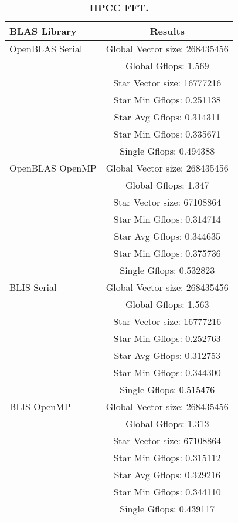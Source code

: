 \begin{table}[h]
\begin{center}
\begin{tabular}{ |l|c| } 
\hline
\textbf{BLAS Library} & \textbf{Results} \\ 
\hline
OpenBLAS Serial & Global Vector size: 268435456\\
                & Global Gflops:      1.569 \\
                \cline{2-2} 
                & Star Vector size:   16777216 \\
                & Star Min Gflops:    0.251138 \\
                & Star Avg Gflops:    0.314311 \\ 
                & Star Min Gflops:    0.335671 \\
                \cline{2-2}
                & Single Gflops:      0.494388 \\
\hline
OpenBLAS OpenMP & Global Vector size: 268435456 \\
                & Global Gflops:      1.347 \\
                \cline{2-2} 
                & Star Vector size:   67108864 \\
                & Star Min Gflops:    0.314714 \\
                & Star Avg Gflops:    0.344635 \\ 
                & Star Min Gflops:    0.375736 \\
                \cline{2-2}
                & Single Gflops:      0.532823 \\
\hline
BLIS Serial     & Global Vector size: 268435456 \\
                & Global Gflops:      1.563 \\
                \cline{2-2} 
                & Star Vector size:   16777216 \\
                & Star Min Gflops:    0.252763 \\
                & Star Avg Gflops:    0.312753 \\ 
                & Star Min Gflops:    0.344300 \\
                \cline{2-2}
                & Single Gflops:      0.515476\\
\hline
BLIS OpenMP     & Global Vector size: 268435456 \\
                & Global Gflops:      1.313 \\
                \cline{2-2} 
                & Star Vector size:   67108864 \\
                & Star Min Gflops:    0.315112 \\
                & Star Avg Gflops:    0.329216 \\ 
                & Star Min Gflops:    0.344110 \\
                \cline{2-2}
                & Single Gflops:      0.439117 \\
\hline
\end{tabular}
\end{center}
\caption{\label{tab:table-name}\textbf{HPCC FFT.}}
\end{table}


